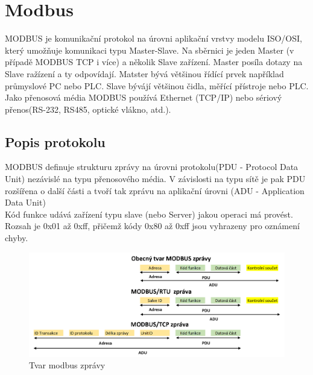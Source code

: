 \documentclass[a4paper,12pt,czech,bibliography=totoc]{scrbook}
\begin{document}
\section{Modbus}
MODBUS je komunikační protokol na úrovni aplikační vrstvy modelu ISO/OSI, který umožňuje komunikaci typu Master-Slave. Na sběrnici je jeden Master (v případě MODBUS TCP i více) a několik Slave zařízení. Master posíla dotazy na Slave ražízení a ty odpovídají. Matster bývá většinou řídící prvek například průmyslové PC nebo PLC. Slave bývájí většinou čidla, měřící přístroje nebo PLC. Jako přenosová média MODBUS používá Ethernet (TCP/IP) nebo sériový přenos(RS-232, RS485, optické vlákno, atd.).
\subsection{Popis protokolu}
MODBUS definuje strukturu zprávy na úrovni protokolu(PDU - Protocol Data Unit) nezávislé na typu přenosového média. V závislosti na typu sítě je pak PDU rozšířena o další části a tvoří tak zprávu na aplikační úrovni (ADU - Application Data Unit)\\
Kód funkce udává zařízení typu slave (nebo Server) jakou operaci má provést. Rozsah je 0x01 až 0xff, přičemž kódy 0x80 až 0xff jsou vyhrazeny pro oznámení chyby.
\begin{figure}[h]
	\centering
	\includegraphics[scale=0.35]{modbus.PNG}
	\caption{Tvar modbus zprávy}
	\label{fig:my_label}
\end{figure}
\newpage
\end{document}
